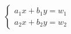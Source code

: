 \documentclass[preview]{standalone}
\begin{document}
\begin{align*}
\begin{cases} a_1 x + b_1 y = w_1 \\ a_2 x + b_2 y = w_2 \end{cases}
\end{align*}
\end{document}
